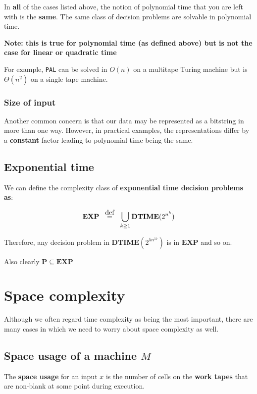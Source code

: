 \documentclass{article}
\newcommand\defeq{\stackrel{\mathclap{\normalfont\mbox{def}}}{=}}
\begin{document}
In \textbf{all} of the cases listed above, the notion of polynomial time that you are left with is the \textbf{same}. The same class of decision problems are solvable in polynomial time.

\textbf{Note: this is true for polynomial time (as defined above) but is not the case for linear or quadratic time }

For example, \texttt{PAL} can be solved in $O(n)$ on a multitape Turing machine but is $\Theta(n^{2})$ on a single tape machine.

\subsubsection{Size of input}

Another common concern is that our data may be represented as a bitstring in more than one way. However, in practical examples, the representations differ by a \textbf{constant} factor leading to polynomial time being the same.

\subsection{Exponential time}

We can define the complexity class of \textbf{exponential time decision problems as}:

\[
  \mathbf{EXP} \;\;\; \defeq \;\;\; \bigcup_{k\geq 1 }\mathbf{DTIME} (2^{n^{k}})
\]

Therefore, any decision problem in $\mathbf{DTIME} (2^{5n^{17}})$ is in $\mathbf{EXP} $ and so on.

Also clearly $\mathbf{P} \subseteq \mathbf{EXP} $

\section{Space complexity}

Although we often regard time complexity as being the most important, there are many cases in which we need to worry about space complexity as well.

\subsection{Space usage of a machine $M$}

The \textbf{space usage} for an input $x$ is the number of cells on the \textbf{work tapes} that are non-blank at some point during execution.
\end{document}
